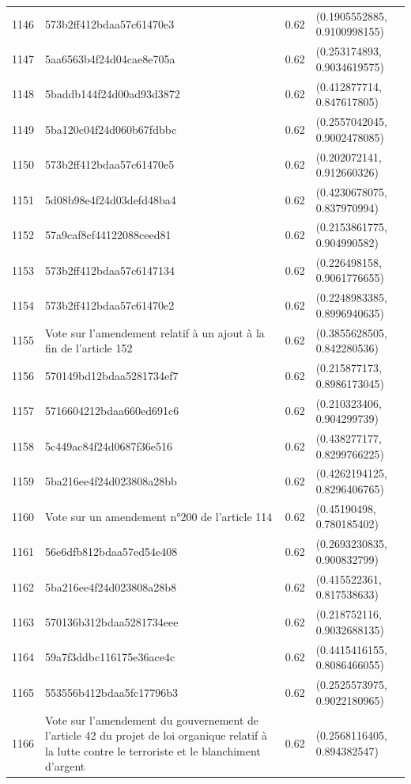 \begin{table}[ht]
\begin{tabular}{rlrl}
  1146 & 573b2ff412bdaa57c61470e3 & 0.62 & (0.1905552885, 0.9100998155) \\ 
  1147 & 5aa6563b4f24d04cae8e705a & 0.62 & (0.253174893, 0.9034619575) \\ 
  1148 & 5baddb144f24d00ad93d3872 & 0.62 & (0.412877714, 0.847617805) \\ 
  1149 & 5ba120c04f24d060b67fdbbc & 0.62 & (0.2557042045, 0.9002478085) \\ 
  1150 & 573b2ff412bdaa57c61470e5 & 0.62 & (0.202072141, 0.912660326) \\ 
  1151 & 5d08b98e4f24d03defd48ba4 & 0.62 & (0.4230678075, 0.837970994) \\ 
  1152 & 57a9caf8cf44122088ceed81 & 0.62 & (0.2153861775, 0.904990582) \\ 
  1153 & 573b2ff412bdaa57c6147134 & 0.62 & (0.226498158, 0.9061776655) \\ 
  1154 & 573b2ff412bdaa57c61470e2 & 0.62 & (0.2248983385, 0.8996940635) \\ 
  1155 & Vote sur l'amendement relatif à un ajout à la fin de l'article 152 & 0.62 & (0.3855628505, 0.842280536) \\ 
  1156 & 570149bd12bdaa5281734ef7 & 0.62 & (0.215877173, 0.8986173045) \\ 
  1157 & 5716604212bdaa660ed691c6 & 0.62 & (0.210323406, 0.904299739) \\ 
  1158 & 5c449ac84f24d0687f36e516 & 0.62 & (0.438277177, 0.8299766225) \\ 
  1159 & 5ba216ee4f24d023808a28bb & 0.62 & (0.4262194125, 0.8296406765) \\ 
  1160 & Vote sur un amendement n°200 de l'article 114 & 0.62 & (0.45190498, 0.780185402) \\ 
  1161 & 56e6dfb812bdaa57ed54e408 & 0.62 & (0.2693230835, 0.900832799) \\ 
  1162 & 5ba216ee4f24d023808a28b8 & 0.62 & (0.415522361, 0.817538633) \\ 
  1163 & 570136b312bdaa5281734eee & 0.62 & (0.218752116, 0.9032688135) \\ 
  1164 & 59a7f3ddbc116175e36ace4c & 0.62 & (0.4415416155, 0.8086466055) \\ 
  1165 & 553556b412bdaa5fc17796b3 & 0.62 & (0.2525573975, 0.9022180965) \\ 
  1166 & Vote sur l'amendement du gouvernement de l'article 42 du projet de loi organique relatif à la lutte contre le terroriste et le blanchiment d'argent & 0.62 & (0.2568116405, 0.894382547) \\ 

\end{tabular}
\end{table}

